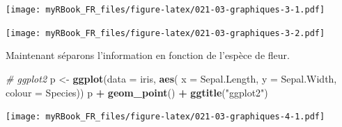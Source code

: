 \documentclass[
]{book}
\newenvironment{Shaded}{\begin{snugshade}}{\end{snugshade}}
\newcommand{\CommentTok}[1]{\textcolor[rgb]{0.56,0.35,0.01}{\textit{#1}}}
\newcommand{\DataTypeTok}[1]{\textcolor[rgb]{0.13,0.29,0.53}{#1}}
\newcommand{\DecValTok}[1]{\textcolor[rgb]{0.00,0.00,0.81}{#1}}
\newcommand{\FloatTok}[1]{\textcolor[rgb]{0.00,0.00,0.81}{#1}}
\newcommand{\KeywordTok}[1]{\textcolor[rgb]{0.13,0.29,0.53}{\textbf{#1}}}
\newcommand{\NormalTok}[1]{#1}
\newcommand{\OperatorTok}[1]{\textcolor[rgb]{0.81,0.36,0.00}{\textbf{#1}}}
\newcommand{\StringTok}[1]{\textcolor[rgb]{0.31,0.60,0.02}{#1}}
\begin{document}
\texttt{[image: myRBook\_FR\_files/figure-latex/021-03-graphiques-3-1.pdf]}

\begin{Shaded}
\end{Shaded}

\texttt{[image: myRBook\_FR\_files/figure-latex/021-03-graphiques-3-2.pdf]}

Maintenant séparons l'information en fonction de l'espèce de fleur.

\begin{Shaded}
\begin{Highlighting}[]
\CommentTok{# ggplot2}
\NormalTok{p <-}\StringTok{ }\KeywordTok{ggplot}\NormalTok{(}\DataTypeTok{data =}\NormalTok{ iris, }\KeywordTok{aes}\NormalTok{(}
  \DataTypeTok{x =}\NormalTok{ Sepal.Length, }
  \DataTypeTok{y =}\NormalTok{ Sepal.Width, }
  \DataTypeTok{colour =}\NormalTok{ Species))}
\NormalTok{p }\OperatorTok{+}\StringTok{ }\KeywordTok{geom_point}\NormalTok{() }\OperatorTok{+}\StringTok{ }\KeywordTok{ggtitle}\NormalTok{(}\StringTok{"ggplot2"}\NormalTok{)}
\end{Highlighting}
\end{Shaded}

\texttt{[image: myRBook\_FR\_files/figure-latex/021-03-graphiques-4-1.pdf]}

\begin{Shaded}
\end{Shaded}
\end{document}

